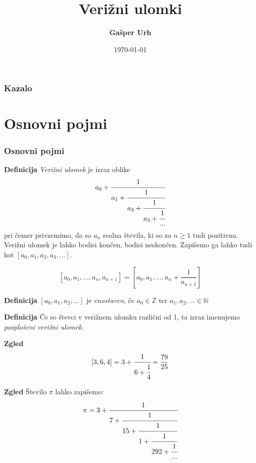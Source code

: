 \documentclass{beamer}
\title[Verižni ulomki]{Verižni ulomki}
\author[Gašper Urh]{\textbf {Gašper Urh}}
\institute[FMF UL]{\textbf {Fakulteta za matematiko in fiziko Univerze v Ljubljani}}
\date{\today}
\newcommand{\N}{\mathbb{N}}
\newcommand{\Z}{\mathbb{Z}}
\newenvironment{df}{\begin{block}{\textbf{Definicija}}}{\end{block}}
\newenvironment{zg}{\begin{block}{\textbf{Zgled}}}{\end{block}}
\begin{document}
\begin{frame}
\maketitle
\end{frame}

\begin{frame}
\frametitle{Kazalo}
\tableofcontents
\end{frame}

\section{Osnovni pojmi}

\begin{frame}
\frametitle{Osnovni pojmi}
	\begin{df}
	\textit{Verižni ulomek} je izraz oblike
	\[ a_0 + \cfrac{1}{a_1 + \cfrac{1}{a_2 + \cfrac{1}{a_3 + \cfrac{1}{...}}}} \]
	pri čemer privzemimo, da so $a_n$ realna števila, ki so za $n \geq 1$ tudi pozitivna. Verižni ulomek je lahko bodisi končen, bodisi neskončen.
	\newline
	\newline
	Zapišemo ga lahko tudi kot $[a_0, a_1, a_2, a_3, ...]$.
	\end{df}
\end{frame}

\begin{frame}
	\[ [a_0, a_1, ..., a_n, a_{n+1}]=[a_0, a_1, ..., a_n+\frac{1}{a_{n+1}}] \] \pause
	\begin{df}
	$[a_0, a_1, a_2, ...]$ je \textit{enostaven}, če $a_0 \in \Z$ ter $a_1, a_2, ... \in \N$
	\end{df}
	\pause
	\begin{df}
	Če so števci v verižnem ulomku različni od 1, ta izraz imenujemo \textit{posplošeni verižni ulomek}.
	\end{df}
\end{frame}

\begin{frame}
	\begin{zg}
	\[ [3,6,4] = 3 + \cfrac{1}{6+\cfrac{1}{4}} = \frac{79}{25}\]
	\end{zg}
	\pause
	\begin{zg}
	Število $\pi$ lahko zapišemo: \[ \pi = 3 + \cfrac{1}{7 + \cfrac{1}{15 + \cfrac{1}{1 + \cfrac{1}{292 + \cfrac{1}{...}}}}} \]
	\end{zg}
\end{frame}
\end{document}
